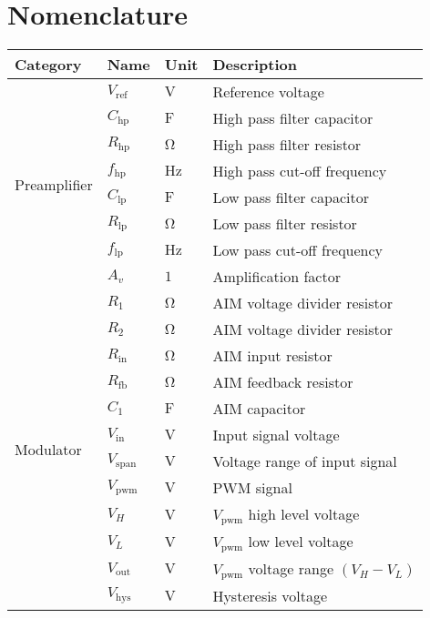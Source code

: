 \chapter*{Nomenclature} \label{cha:denotation}
\begin{longtable}{@{}llll@{}}
	\toprule
	\textbf{Category } & \textbf{Name}    & \textbf{Unit}        & \textbf{Description} \\ \midrule
	\endhead
	\multirow{8}{*}{Preamplifier}       & $V_{\mathrm{ref}}$ & $\si{\volt}$ & Reference voltage \\
	& $C_{\mathrm{hp}}$ & $\si{\farad}$ & High pass filter capacitor \\
	& $R_{\mathrm{hp}}$ & $\si{\ohm}$ & High pass filter resistor \\
	& $f_{\mathrm{hp}}$ & $\si{\hertz}$ & High pass cut-off frequency \\
	& $C_{\mathrm{lp}}$ & $\si{\farad}$ & Low pass filter capacitor \\
	& $R_{\mathrm{lp}}$ & $\si{\ohm}$ & Low pass filter resistor \\
	& $f_{\mathrm{lp}}$ & $\si{\hertz}$ & Low pass cut-off frequency \\
	& $A_{v}$ & $1$ & Amplification factor \\ \midrule
	\multirow{27}{*}{Modulator} & $R_{1}$ & $\si{\ohm}$ & AIM voltage divider resistor \\
	& $R_{2}$ & $\si{\ohm}$ & AIM voltage divider resistor \\
	& $R_{\mathrm{in}}$ & $\si{\ohm}$ & AIM input resistor \\
	& $R_{\mathrm{fb}}$ & $\si{\ohm}$ & AIM feedback resistor \\
	& $C_{1}$ & $\si{\farad}$ & AIM capacitor \\
	& $V_{\mathrm{in}}$ & $\si{\volt}$ & Input signal voltage \\
	& $V_{\mathrm{span}}$ & $\si{\volt}$ & Voltage range of input signal \\ %
	& $V_{\mathrm{pwm}}$ & $\si{\volt}$ & PWM signal \\
	& $V_{H}$ & $\si{\volt}$ & $V_{\mathrm{pwm}}$ high level voltage \\
	& $V_{L}$ & $\si{\volt}$ & $V_{\mathrm{pwm}}$ low level voltage \\
	& $V_{\mathrm{out}}$ & $\si{\volt}$ & $V_{\mathrm{pwm}}$ voltage range $\left( V_{H} - V_{L} \right) $ \\
	& $V_{\mathrm{hys}}$ & $\si{\volt}$ & Hysteresis voltage \\

\end{longtable}

